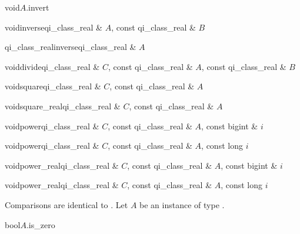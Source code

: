 \begin{fcode}{void}{$A$.invert}{}
\end{fcode}

\begin{fcode}{void}{inverse}{qi_class_real & $A$, const qi_class_real & $B$}
\end{fcode}

\begin{fcode}{qi_class_real}{inverse}{qi_class_real & $A$}
\end{fcode}

\begin{fcode}{void}{divide}{qi_class_real & $C$, const qi_class_real & $A$,
    const qi_class_real & $B$}%
\end{fcode}

\begin{fcode}{void}{square}{qi_class_real & $C$, const qi_class_real & $A$}
\end{fcode}

\begin{fcode}{void}{square_real}{qi_class_real & $C$, const qi_class_real & $A$}
\end{fcode}

\begin{fcode}{void}{power}{qi_class_real & $C$, const qi_class_real & $A$, const bigint & $i$}
\end{fcode}

\begin{fcode}{void}{power}{qi_class_real & $C$, const qi_class_real & $A$, const long $i$}
\end{fcode}

\begin{fcode}{void}{power_real}{qi_class_real & $C$, const qi_class_real & $A$, const bigint & $i$}
\end{fcode}

\begin{fcode}{void}{power_real}{qi_class_real & $C$, const qi_class_real & $A$, const long $i$}
\end{fcode}



\COMP

Comparisons are identical to .  Let $A$ be an instance of type
.

\begin{cfcode}{bool}{$A$.is_zero}{}
\end{cfcode}

